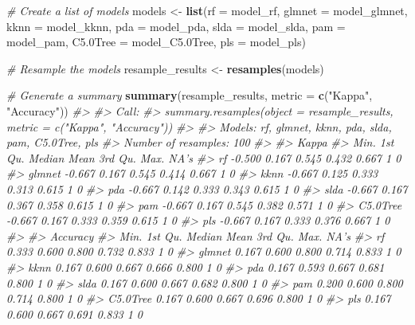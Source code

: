 \documentclass[]{book}
\newenvironment{Shaded}{\begin{snugshade}}{\end{snugshade}}
\newcommand{\CommentTok}[1]{\textcolor[rgb]{0.56,0.35,0.01}{\textit{#1}}}
\newcommand{\DataTypeTok}[1]{\textcolor[rgb]{0.13,0.29,0.53}{#1}}
\newcommand{\FloatTok}[1]{\textcolor[rgb]{0.00,0.00,0.81}{#1}}
\newcommand{\KeywordTok}[1]{\textcolor[rgb]{0.13,0.29,0.53}{\textbf{#1}}}
\newcommand{\NormalTok}[1]{#1}
\newcommand{\StringTok}[1]{\textcolor[rgb]{0.31,0.60,0.02}{#1}}
\begin{document}
\begin{Shaded}
\begin{Highlighting}[]
\CommentTok{# Create a list of models}
\NormalTok{models <-}\StringTok{ }\KeywordTok{list}\NormalTok{(}\DataTypeTok{rf       =}\NormalTok{ model_rf, }
               \DataTypeTok{glmnet   =}\NormalTok{ model_glmnet, }
               \DataTypeTok{kknn     =}\NormalTok{ model_kknn, }
               \DataTypeTok{pda      =}\NormalTok{ model_pda, }
               \DataTypeTok{slda     =}\NormalTok{ model_slda,}
               \DataTypeTok{pam      =}\NormalTok{ model_pam, }
               \DataTypeTok{C5.0Tree =}\NormalTok{ model_C5}\FloatTok{.0}\NormalTok{Tree, }
               \DataTypeTok{pls      =}\NormalTok{ model_pls)}

\CommentTok{# Resample the models}
\NormalTok{resample_results <-}\StringTok{ }\KeywordTok{resamples}\NormalTok{(models)}

\CommentTok{# Generate a summary}
\KeywordTok{summary}\NormalTok{(resample_results, }\DataTypeTok{metric =} \KeywordTok{c}\NormalTok{(}\StringTok{"Kappa"}\NormalTok{, }\StringTok{"Accuracy"}\NormalTok{))}
\CommentTok{#> }
\CommentTok{#> Call:}
\CommentTok{#> summary.resamples(object = resample_results, metric = c("Kappa", "Accuracy"))}
\CommentTok{#> }
\CommentTok{#> Models: rf, glmnet, kknn, pda, slda, pam, C5.0Tree, pls }
\CommentTok{#> Number of resamples: 100 }
\CommentTok{#> }
\CommentTok{#> Kappa }
\CommentTok{#>            Min. 1st Qu. Median  Mean 3rd Qu. Max. NA's}
\CommentTok{#> rf       -0.500   0.167  0.545 0.432   0.667    1    0}
\CommentTok{#> glmnet   -0.667   0.167  0.545 0.414   0.667    1    0}
\CommentTok{#> kknn     -0.667   0.125  0.333 0.313   0.615    1    0}
\CommentTok{#> pda      -0.667   0.142  0.333 0.343   0.615    1    0}
\CommentTok{#> slda     -0.667   0.167  0.367 0.358   0.615    1    0}
\CommentTok{#> pam      -0.667   0.167  0.545 0.382   0.571    1    0}
\CommentTok{#> C5.0Tree -0.667   0.167  0.333 0.359   0.615    1    0}
\CommentTok{#> pls      -0.667   0.167  0.333 0.376   0.667    1    0}
\CommentTok{#> }
\CommentTok{#> Accuracy }
\CommentTok{#>           Min. 1st Qu. Median  Mean 3rd Qu. Max. NA's}
\CommentTok{#> rf       0.333   0.600  0.800 0.732   0.833    1    0}
\CommentTok{#> glmnet   0.167   0.600  0.800 0.714   0.833    1    0}
\CommentTok{#> kknn     0.167   0.600  0.667 0.666   0.800    1    0}
\CommentTok{#> pda      0.167   0.593  0.667 0.681   0.800    1    0}
\CommentTok{#> slda     0.167   0.600  0.667 0.682   0.800    1    0}
\CommentTok{#> pam      0.200   0.600  0.800 0.714   0.800    1    0}
\CommentTok{#> C5.0Tree 0.167   0.600  0.667 0.696   0.800    1    0}
\CommentTok{#> pls      0.167   0.600  0.667 0.691   0.833    1    0}
\end{Highlighting}
\end{Shaded}
\end{document}
